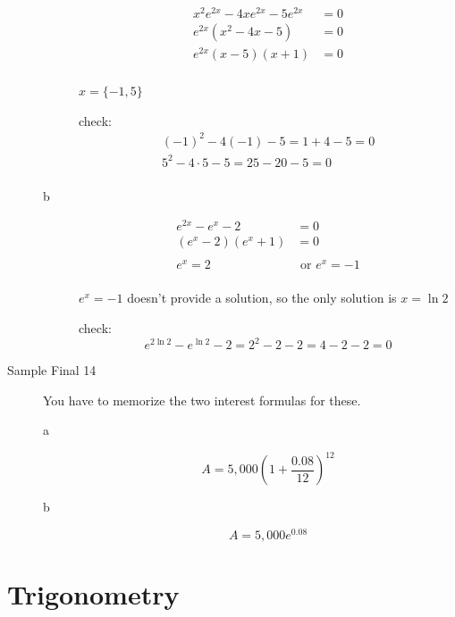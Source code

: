 \documentclass[fleqn,addpoints]{exam}
\begin{document}
\begin{description}
\begin{description}
\begin{align*}
  x^2e^{2x} - 4xe^{2x} - 5e^{2x} &= 0 \\
  e^{2x} ( x^2 - 4x - 5) &= 0 \\
  e^{2x} (x-5)(x+1) &= 0 \\
\end{align*}

$x = \{-1, 5 \}$

check:
\begin{align*}
  (-1)^2 - 4(-1) - 5 = 1 + 4 - 5 = 0 \\
  5^2 - 4 \cdot 5 - 5 = 25 - 20 - 5 = 0 \\
\end{align*}

\item[b]
\begin{align*}
  e^{2x} - e^x - 2 &= 0 \\
  (e^x - 2)(e^x + 1) &= 0 \\
  \\
  e^x = 2 & \text{ or } e^x = -1 \\
\end{align*}

$e^x = -1$ doesn't provide a solution, so the only solution is $x = \ln 2$

check:
\[
  e^{2 \ln 2} - e^{\ln 2} - 2 = 2^2 - 2 - 2 = 4 - 2 - 2 = 0
\]

\end{description}

\item[Sample Final 14]
You have to memorize the two interest formulas for these.

\begin{description}

\item[a]
\[
  A = 5,000 \left(1 + \frac{0.08}{12} \right)^{12}
\]

\item[b]
\[
  A = 5,000 e^{0.08}
\]

\end{description}

\end{description}


\section{Trigonometry}
\end{document}
